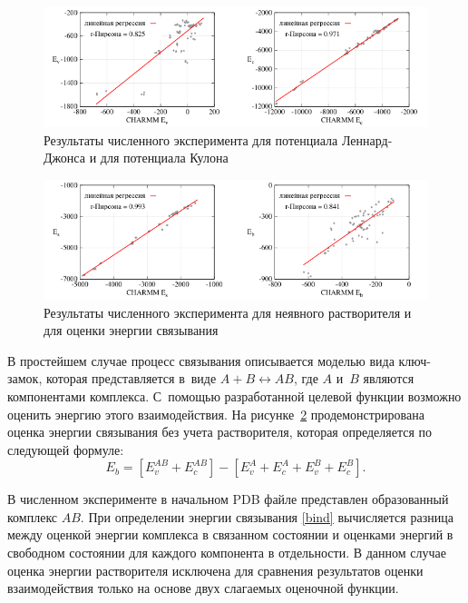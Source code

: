 \begin{figure}[h!]
	\centering
	\includegraphics[width=1.0\linewidth]{images/first.pdf}
	\caption{Результаты численного эксперимента для потенциала Леннард-Джонса и для потенциала Кулона}
	\label{first}
\end{figure}

\begin{figure}[h!]
	\centering
	\includegraphics[width=1.0\linewidth]{images/second.pdf}
	\caption{Результаты численного эксперимента для неявного растворителя и для оценки энергии связывания}
	\label{second}
\end{figure}

В простейшем случае процесс связывания описывается моделью вида ключ-замок, которая представляется в~виде $A+B\leftrightarrow AB$, где $A$ и~$B$ являются компонентами комплекса. С~помощью разработанной целевой функции возможно оценить энергию этого взаимодействия. На рисунке~\ref{second} продемонстрирована оценка энергии связывания без учета растворителя, которая определяется по следующей формуле:
\begin{equation}
	E_{b}=\left[E_{v}^{AB} + E_{c}^{AB}\right] - \left[E_{v}^{A} + E_{c}^{A} + E_{v}^{B} + E_{c}^{B}\right].
	\label{bind}
\end{equation}

В численном эксперименте в начальном PDB файле представлен образованный комплекс $AB$. При определении энергии связывания \eqref{bind} вычисляется разница между оценкой энергии комплекса в связанном состоянии и оценками энергий в свободном состоянии для каждого компонента в отдельности. В данном случае оценка энергии растворителя исключена для сравнения результатов оценки взаимодействия только на основе двух слагаемых оценочной функции.

